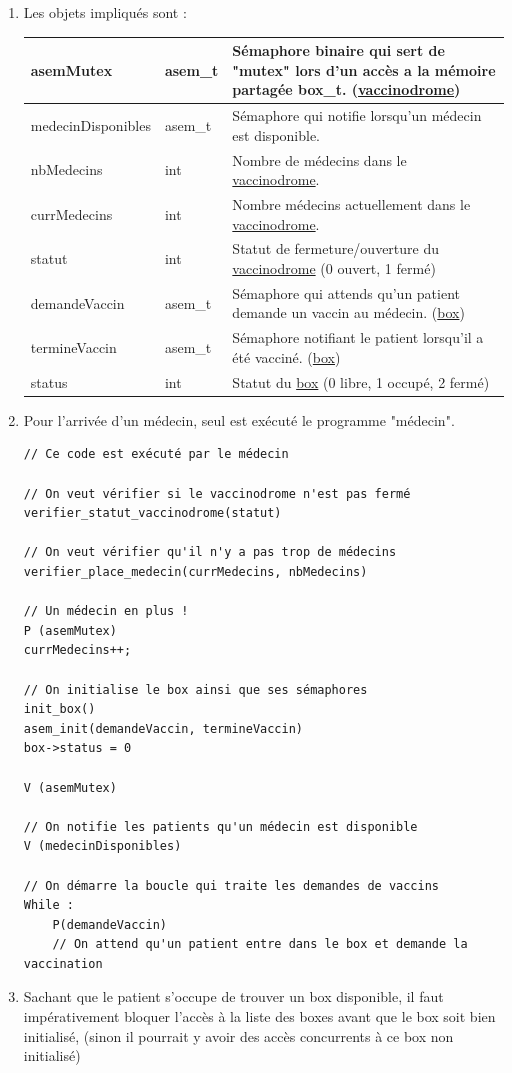 \documentclass[a4paper]{article}
\begin{document}
  \begin{enumerate}
    \item Les objets impliqués sont :

    \begin{tabularx}{\linewidth}{|l|l|>{\strut}X|}
      \hline%
      asemMutex & asem\_t & Sémaphore binaire qui sert de "mutex" lors d'un accès a la mémoire partagée box\_t. (\underline{vaccinodrome}) \\ \hline%
      medecinDisponibles & asem\_t & Sémaphore qui notifie lorsqu'un médecin est disponible. \\ \hline%

      nbMedecins & int & Nombre de médecins dans le \underline{vaccinodrome}. \\ \hline%
      currMedecins & int & Nombre médecins actuellement dans le \underline{vaccinodrome}. \\ \hline%
      statut & int & Statut de fermeture/ouverture du \underline{vaccinodrome} (0 ouvert, 1 fermé) \\ \hline%

      demandeVaccin & asem\_t & Sémaphore qui attends qu'un patient demande un vaccin au médecin. (\underline{box}) \\ \hline%
      termineVaccin & asem\_t & Sémaphore notifiant le patient lorsqu'il a été vacciné. (\underline{box}) \\ \hline%
      status & int & Statut du \underline{box} (0 libre, 1 occupé, 2 fermé) \\ \hline%
    \end{tabularx}

    \item Pour l'arrivée d'un médecin, seul est exécuté le programme "médecin".

    \begin{verbatim}
// Ce code est exécuté par le médecin

// On veut vérifier si le vaccinodrome n'est pas fermé
verifier_statut_vaccinodrome(statut)

// On veut vérifier qu'il n'y a pas trop de médecins
verifier_place_medecin(currMedecins, nbMedecins)

// Un médecin en plus !
P (asemMutex)
currMedecins++;

// On initialise le box ainsi que ses sémaphores
init_box()
asem_init(demandeVaccin, termineVaccin)
box->status = 0

V (asemMutex)

// On notifie les patients qu'un médecin est disponible
V (medecinDisponibles)

// On démarre la boucle qui traite les demandes de vaccins
While :
    P(demandeVaccin)
    // On attend qu'un patient entre dans le box et demande la vaccination

    \end{verbatim}

    \item Sachant que le patient s'occupe de trouver un box disponible, il faut impérativement bloquer l'accès à la liste des boxes avant que le box soit bien initialisé, (sinon il pourrait y avoir des accès concurrents à ce box non initialisé)
  \end{enumerate}
  \newpage
\end{document}
